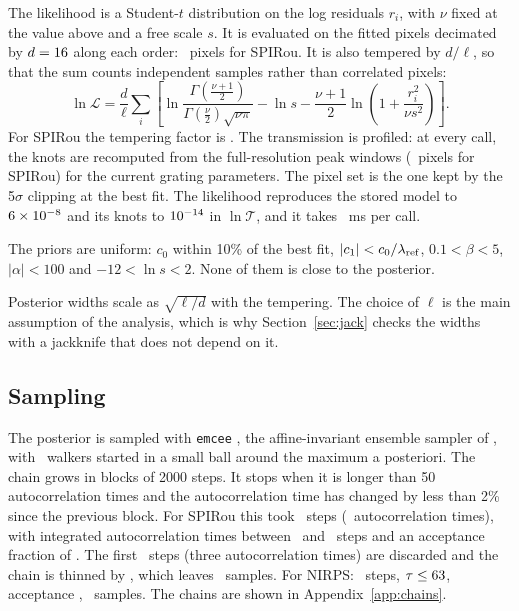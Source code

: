 \documentclass[11pt,a4paper]{article}
\newcommand{\code}[1]{\texttt{#1}}
\begin{document}
The likelihood is a Student-$t$ distribution on the log residuals $r_i$, with $\nu$ fixed at the value above and a free scale $s$. It is evaluated on the fitted pixels decimated by $d=16$ along each order: \spNlike\ pixels for SPIRou. It is also tempered by $d/\ell$, so that the sum counts independent samples rather than correlated pixels:
\begin{equation}
\ln\mathcal{L} = \frac{d}{\ell}\sum_i\left[\ln\frac{\Gamma\left(\frac{\nu+1}{2}\right)}{\Gamma\left(\frac{\nu}{2}\right)\sqrt{\nu\pi}} - \ln s - \frac{\nu+1}{2}\ln\left(1+\frac{r_i^2}{\nu s^2}\right)\right].
\label{eq:like}
\end{equation}
For SPIRou the tempering factor is \spTemper. The transmission is profiled: at every call, the knots are recomputed from the full-resolution peak windows (\spNwin\ pixels for SPIRou) for the current grating parameters. The pixel set is the one kept by the 5$\sigma$ clipping at the best fit. The likelihood reproduces the stored model to $6\times10^{-8}$ and its knots to $10^{-14}$ in $\ln\mathcal{T}$, and it takes \spLikeMs~ms per call.

The priors are uniform: $c_0$ within 10\% of the best fit, $|c_1| < c_0/\lambda_{\rm ref}$, $0.1<\beta<5$, $|\alpha|<100$ and $-12<\ln s<2$. None of them is close to the posterior.

Posterior widths scale as $\sqrt{\ell/d}$ with the tempering. The choice of $\ell$ is the main assumption of the analysis, which is why Section~\ref{sec:jack} checks the widths with a jackknife that does not depend on it.

\subsection{Sampling}

The posterior is sampled with \code{emcee} \citep{ForemanMackey2013}, the affine-invariant ensemble sampler of \citet{Goodman2010}, with \spNwalkers\ walkers started in a small ball around the maximum a posteriori. The chain grows in blocks of 2000 steps. It stops when it is longer than 50 autocorrelation times and the autocorrelation time has changed by less than 2\% since the previous block. For SPIRou this took \spNsteps\ steps (\spStepsOverTau\ autocorrelation times), with integrated autocorrelation times between \spTauMin\ and \spTauMax\ steps and an acceptance fraction of \spAcc. The first \spBurn\ steps (three autocorrelation times) are discarded and the chain is thinned by \spThin, which leaves \spNsamples\ samples. For NIRPS: \niNsteps\ steps, $\tau \le 63$, acceptance \niAcc, \niNsamples\ samples. The chains are shown in Appendix~\ref{app:chains}.
\end{document}
